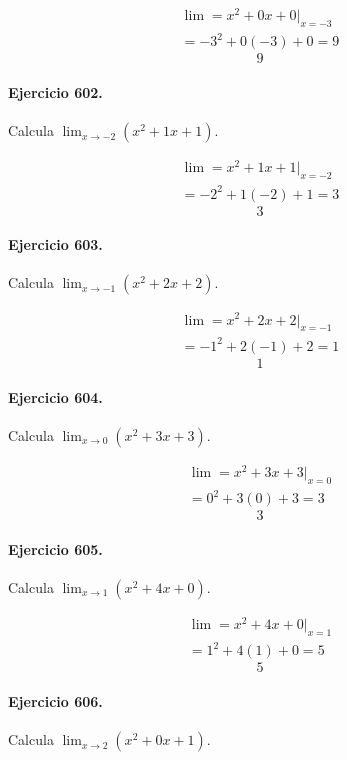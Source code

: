 \documentclass[11pt,a4paper]{article}
\begin{document}
\[
\begin{aligned}
\lim=x^2+0x+0\big|_{x=-3}\\
=-3^2+0(-3)+0=9
\end{aligned}
\]
\[\boxed{9}\]


\paragraph{Ejercicio 602.} Calcula $\displaystyle\lim_{x\to -2}(x^2+1x+1)$.

\[
\begin{aligned}
\lim=x^2+1x+1\big|_{x=-2}\\
=-2^2+1(-2)+1=3
\end{aligned}
\]
\[\boxed{3}\]


\paragraph{Ejercicio 603.} Calcula $\displaystyle\lim_{x\to -1}(x^2+2x+2)$.

\[
\begin{aligned}
\lim=x^2+2x+2\big|_{x=-1}\\
=-1^2+2(-1)+2=1
\end{aligned}
\]
\[\boxed{1}\]


\paragraph{Ejercicio 604.} Calcula $\displaystyle\lim_{x\to 0}(x^2+3x+3)$.

\[
\begin{aligned}
\lim=x^2+3x+3\big|_{x=0}\\
=0^2+3(0)+3=3
\end{aligned}
\]
\[\boxed{3}\]


\paragraph{Ejercicio 605.} Calcula $\displaystyle\lim_{x\to 1}(x^2+4x+0)$.

\[
\begin{aligned}
\lim=x^2+4x+0\big|_{x=1}\\
=1^2+4(1)+0=5
\end{aligned}
\]
\[\boxed{5}\]


\paragraph{Ejercicio 606.} Calcula $\displaystyle\lim_{x\to 2}(x^2+0x+1)$.
\end{document}
